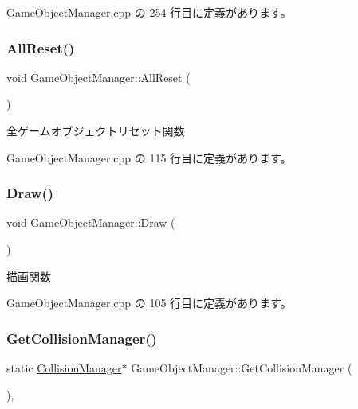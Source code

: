 Game\+Object\+Manager.\+cpp の 254 行目に定義があります。

\mbox{\label{class_game_object_manager_a38f980aec0970f45eb9bc55db8ac01a3}} 
\subsubsection{\texorpdfstring{All\+Reset()}{AllReset()}}
{\footnotesize\ttfamily void Game\+Object\+Manager\+::\+All\+Reset (\begin{DoxyParamCaption}{ }\end{DoxyParamCaption})\hspace{0.3cm}{\ttfamily [static]}}



全ゲームオブジェクトリセット関数 



 Game\+Object\+Manager.\+cpp の 115 行目に定義があります。

\mbox{\label{class_game_object_manager_a0549bd4b6575ee28803c0ff8fd2be2ee}} 
\subsubsection{\texorpdfstring{Draw()}{Draw()}}
{\footnotesize\ttfamily void Game\+Object\+Manager\+::\+Draw (\begin{DoxyParamCaption}{ }\end{DoxyParamCaption})\hspace{0.3cm}{\ttfamily [static]}}



描画関数 



 Game\+Object\+Manager.\+cpp の 105 行目に定義があります。

\mbox{\label{class_game_object_manager_a41775a8308691a84b468a0aeeb1b3376}} 
\subsubsection{\texorpdfstring{Get\+Collision\+Manager()}{GetCollisionManager()}}
{\footnotesize\ttfamily static \mbox{\hyperlink{class_collision_manager}{Collision\+Manager}}$\ast$ Game\+Object\+Manager\+::\+Get\+Collision\+Manager (\begin{DoxyParamCaption}{ }\end{DoxyParamCaption})\hspace{0.3cm}{\ttfamily [inline]}, {\ttfamily [static]}}



